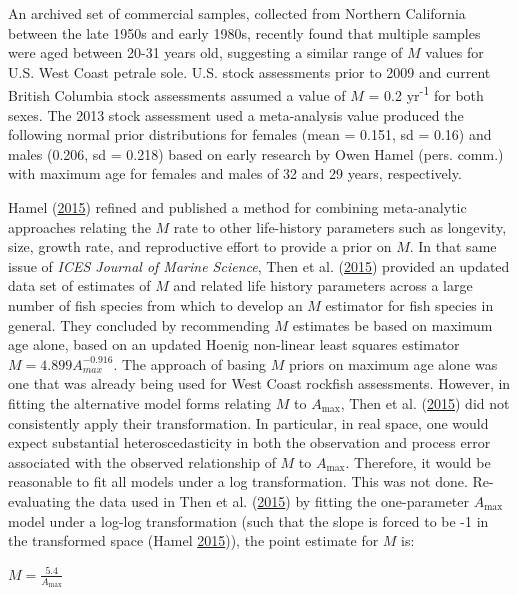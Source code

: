 \documentclass[12pt,]{article}
\begin{document}
An archived set of commercial samples, collected from Northern
California between the late 1950s and early 1980s, recently found that
multiple samples were aged between 20-31 years old, suggesting a similar
range of \(M\) values for U.S. West Coast petrale sole. U.S. stock
assessments prior to 2009 and current British Columbia stock assessments
assumed a value of \(M\) = 0.2 yr\textsuperscript{-1} for both sexes.
The 2013 stock assessment used a meta-analysis value produced the
following normal prior distributions for females (mean = 0.151, sd =
0.16) and males (0.206, sd = 0.218) based on early research by Owen
Hamel (pers. comm.) with maximum age for females and males of 32 and 29
years, respectively.

Hamel (\protect\hyperlink{ref-hamel_method_2015}{2015}) refined and
published a method for combining meta-analytic approaches relating the
\(M\) rate to other life-history parameters such as longevity, size,
growth rate, and reproductive effort to provide a prior on \(M\). In
that same issue of \emph{ICES Journal of Marine Science}, Then et al.
(\protect\hyperlink{ref-then_evaluating_2015}{2015}) provided an updated
data set of estimates of \(M\) and related life history parameters
across a large number of fish species from which to develop an \(M\)
estimator for fish species in general. They concluded by recommending
\(M\) estimates be based on maximum age alone, based on an updated
Hoenig non-linear least squares estimator \(M=4.899A^{-0.916}_{max}\).
The approach of basing \(M\) priors on maximum age alone was one that
was already being used for West Coast rockfish assessments. However, in
fitting the alternative model forms relating \(M\) to
\(A_{\text{max}}\), Then et al.
(\protect\hyperlink{ref-then_evaluating_2015}{2015}) did not
consistently apply their transformation. In particular, in real space,
one would expect substantial heteroscedasticity in both the observation
and process error associated with the observed relationship of \(M\) to
\(A_{\text{max}}\). Therefore, it would be reasonable to fit all models
under a log transformation. This was not done. Re-evaluating the data
used in Then et al. (\protect\hyperlink{ref-then_evaluating_2015}{2015})
by fitting the one-parameter \(A_{\text{max}}\) model under a log-log
transformation (such that the slope is forced to be -1 in the
transformed space (Hamel
\protect\hyperlink{ref-hamel_method_2015}{2015})), the point estimate
for \(M\) is:

\begin{centering}

$M=\frac{5.4}{A_{\text{max}}}$

\end{centering}
\end{document}
